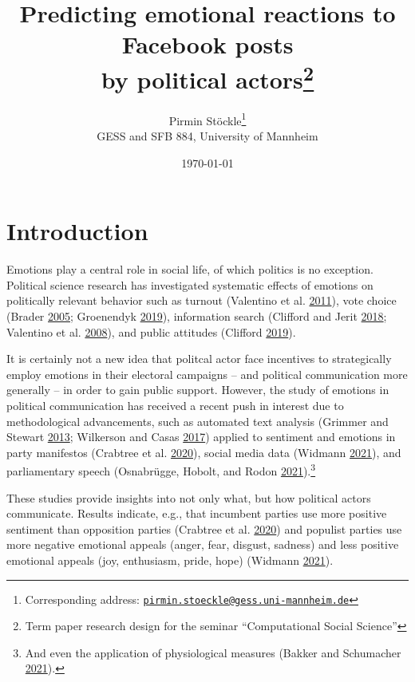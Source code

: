 \documentclass[
  12pt,
]{article}
\title{Predicting emotional reactions to Facebook posts\\
by political actors\footnote{Term paper research design for the seminar ``Computational Social Science''}}
\author{Pirmin Stöckle\footnote{Corresponding address: \href{mailto:pirmin.stoeckle@gess.uni-mannheim.de}{\nolinkurl{pirmin.stoeckle@gess.uni-mannheim.de}}}\\
GESS and SFB 884, University of Mannheim}
\date{\today}
\begin{document}
\maketitle

\hypertarget{introduction}{%
\section{Introduction}\label{introduction}}

Emotions play a central role in social life, of which politics is no exception. Political science research has investigated systematic effects of emotions on politically relevant behavior such as turnout (Valentino et al. \protect\hyperlink{ref-valentino2011election}{2011}), vote choice (Brader \protect\hyperlink{ref-brader2005striking}{2005}; Groenendyk \protect\hyperlink{ref-groenendyk2019two}{2019}), information search (Clifford and Jerit \protect\hyperlink{ref-clifford2018disgust}{2018}; Valentino et al. \protect\hyperlink{ref-valentino2008worried}{2008}), and public attitudes (Clifford \protect\hyperlink{ref-clifford2019how}{2019}).

It is certainly not a new idea that politcal actor face incentives to strategically employ emotions in their electoral campaigns -- and political communication more generally -- in order to gain public support. However, the study of emotions in political communication has received a recent push in interest due to methodological advancements, such as automated text analysis (Grimmer and Stewart \protect\hyperlink{ref-grimmer2013text}{2013}; Wilkerson and Casas \protect\hyperlink{ref-wilkerson2017large}{2017}) applied to sentiment and emotions in party manifestos (Crabtree et al. \protect\hyperlink{ref-crabtree2020how}{2020}), social media data (Widmann \protect\hyperlink{ref-widmann2021how}{2021}), and parliamentary speech (Osnabrügge, Hobolt, and Rodon \protect\hyperlink{ref-osnabrugge2021playing}{2021}).\footnote{And even the application of physiological measures (Bakker and Schumacher \protect\hyperlink{ref-bakker2021hot}{2021}).}

These studies provide insights into not only what, but how political actors communicate. Results indicate, e.g., that incumbent parties use more positive sentiment than opposition parties (Crabtree et al. \protect\hyperlink{ref-crabtree2020how}{2020}) and populist parties use more negative emotional appeals (anger, fear, disgust, sadness) and less positive emotional appeals (joy, enthusiasm, pride, hope) (Widmann \protect\hyperlink{ref-widmann2021how}{2021}).
\end{document}
